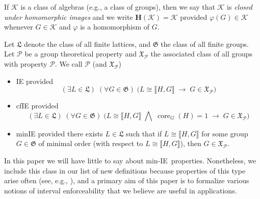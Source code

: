 \documentclass{gen-j-l}
\newcommand{\lb}{\ensuremath{\llbracket}}
\newcommand{\rb}{\ensuremath{\rrbracket}}
\newcommand{\<}{\ensuremath{\langle}}
\renewcommand{\>}{\ensuremath{\rangle}}
\theoremstyle{plain}
\theoremstyle{definition}
\theoremstyle{remark}
\numberwithin{theorem}{section}
\numberwithin{claim}{section}
\numberwithin{equation}{section}
\numberwithin{conjecture}{section}
\newcommand{\Meet}{\ensuremath{\bigwedge}}
\newcommand{\core}{\ensuremath{\operatorname{core}}}
\newcommand{\2}{\ensuremath{\mathbf{2}}}
\newcommand{\3}{\ensuremath{\mathbf{3}}}
\newcommand{\sG}{\ensuremath{\mathfrak{X}}}
\newcommand{\G}{\ensuremath{\mathfrak{G}}}
\newcommand{\bH}{\ensuremath{\mathbf{H}}}
\newcommand{\sK}{\ensuremath{\mathscr{K}}}
\newcommand{\fL}{\ensuremath{\mathfrak{L}}}
\newcommand{\cP}{\ensuremath{\mathcal{P}}}
\newcommand{\IE}{{\small IE}}
\renewcommand{\phi}{\ensuremath{\varphi}}
\begin{document}
If $\sK$ is a class of algebras (e.g., a class of groups), then we say that
$\sK$ is \emph{closed under homomorphic images} and we write $\bH(\sK) = \sK$
provided $\phi(G)\in \sK$ whenever $G\in \sK$ and $\phi$ is a homomorphism of
$G$.

Let $\fL$
denote the class of all finite lattices, and $\G$ the class of all 
finite groups. Let $\cP$ be a group theoretical property and $\sG_\cP$
the associated class of all groups with property $\cP$.  
We call $\cP$ (and $\sG_\cP$)
\begin{itemize}
\item 
\acf{IE} provided
\[
(\exists L\in \fL)  \; (\forall G \in \G) \; \bigl(L\cong \lb H,G \rb \; \longrightarrow \; G
\in \sG_\cP\bigr)
\]
\item
\acf{cfIE} provided
\[
(\exists L\in \fL)  \; (\forall G\in \G) \; \bigl( L\cong \lb H,G \rb \; \Meet \; \core_G(H)=1
\; \longrightarrow \; G  \in \sG_\cP \bigr)
\]
\item 
\acf{minIE}
provided there exists $L\in \fL$ such that if $L\cong \lb H,G \rb$ for some
group $G\in \G$ of minimal order (with respect to $L\cong \lb H,G \rb$), then
$G \in \sG_\cP$.
\end{itemize}
In this paper we will have little to
say about min-\IE\ properties.  Nonetheless, we include this class in our list
of new definitions because properties of this type arise often (see, e.g.,
\cite{Lucchini:1994a}), and a primary aim of this paper is to formalize
various notions of interval enforceability that we believe are
useful in applications. 
\end{document}

